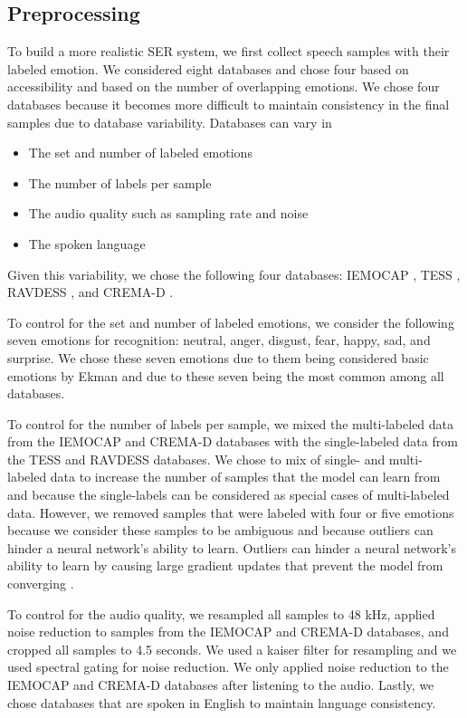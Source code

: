 \documentclass[a4paper, 10pt, conference]{ieeeconf}      %
\begin{document}
\subsection{Preprocessing} \label{Preprocessing}

To build a more realistic SER system, we first collect speech samples with their labeled emotion. We considered eight databases and chose four based on accessibility and based on the number of overlapping emotions. We chose four databases because it becomes more difficult to maintain consistency in the final samples due to database variability. Databases can vary in
\begin{itemize}
	\item The set and number of labeled emotions
	\item The number of labels per sample
	\item The audio quality such as sampling rate and noise
	\item The spoken language
\end{itemize}
Given this variability, we chose the following four databases: IEMOCAP \cite{busso_2008}, TESS \cite{dupuis_2011}, RAVDESS \cite{livingstone_2018}, and CREMA-D \cite{cao_2014}.

To control for the set and number of labeled emotions, we consider the following seven emotions for recognition: neutral, anger, disgust, fear, happy, sad, and surprise. We chose these seven emotions due to them being considered basic emotions by Ekman \cite{Ekman1992} and due to these seven being the most common among all databases. 

To control for the number of labels per sample, we mixed the multi-labeled data from the IEMOCAP and CREMA-D databases with the single-labeled data from the TESS and RAVDESS databases. We chose to mix of single- and multi- labeled data to increase the number of samples that the model can learn from and because the single-labels can be considered as special cases of multi-labeled data. However, we removed samples that were labeled with four or five emotions because we consider these samples to be ambiguous and because outliers can hinder a neural network's ability to learn. Outliers can hinder a neural network's ability to learn by causing large gradient updates that prevent the model from converging \cite{Chollet2017}.

To control for the audio quality, we resampled all samples to 48 kHz, applied noise reduction to samples from the IEMOCAP and CREMA-D databases, and cropped all samples to 4.5 seconds. We used a kaiser filter for resampling and we used spectral gating for noise reduction. We only applied noise reduction to the IEMOCAP and CREMA-D databases after listening to the audio. Lastly, we chose databases that are spoken in English to maintain language consistency.
\end{document}
